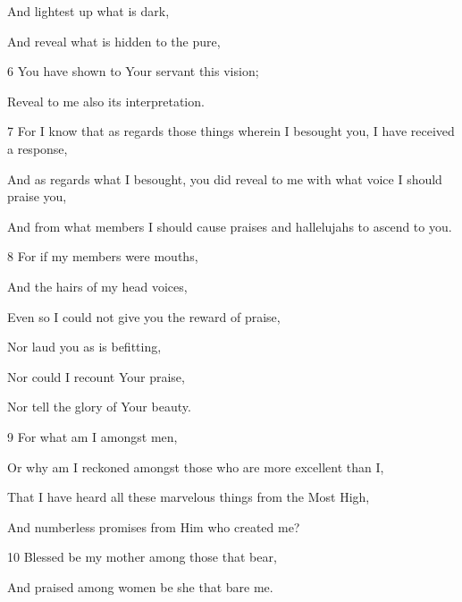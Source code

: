 \par And lightest up what is dark,

\par And reveal what is hidden to the pure,

\par [Who in faith have submitted themselves to you and Your law.]

\par 6 You have shown to Your servant this vision;

\par Reveal to me also its interpretation.

\par 7 For I know that as regards those things wherein I besought you, I have received a response,

\par And as regards what I besought, you did reveal to me with what voice I should praise you,

\par And from what members I should cause praises and hallelujahs to ascend to you.

\par 8 For if my members were mouths,

\par And the hairs of my head voices,

\par Even so I could not give you the reward of praise,

\par Nor laud you as is befitting,

\par Nor could I recount Your praise,

\par Nor tell the glory of Your beauty.

\par 9 For what am I amongst men,

\par Or why am I reckoned amongst those who are more excellent than I,

\par That I have heard all these marvelous things from the Most High,

\par And numberless promises from Him who created me?

\par 10 Blessed be my mother among those that bear,

\par And praised among women be she that bare me.

